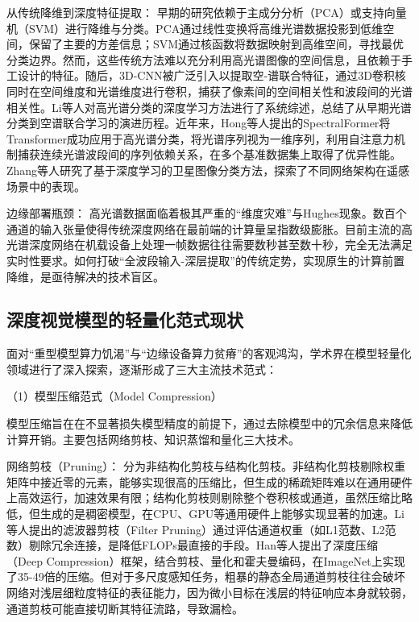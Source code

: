 从传统降维到深度特征提取： 早期的研究依赖于主成分分析（PCA）或支持向量机（SVM）进行降维与分类。PCA通过线性变换将高维光谱数据投影到低维空间，保留了主要的方差信息；SVM通过核函数将数据映射到高维空间，寻找最优分类边界。然而，这些传统方法难以充分利用高光谱图像的空间信息，且依赖于手工设计的特征。随后，3D-CNN被广泛引入以提取空-谱联合特征，通过3D卷积核同时在空间维度和光谱维度进行卷积，捕获了像素间的空间相关性和波段间的光谱相关性。Li等人对高光谱分类的深度学习方法进行了系统综述\cite{li2019hyperspectral}，总结了从早期光谱分类到空谱联合学习的演进历程。近年来，Hong等人提出的SpectralFormer\cite{hong2021spectral}将Transformer成功应用于高光谱分类，将光谱序列视为一维序列，利用自注意力机制捕获连续光谱波段间的序列依赖关系，在多个基准数据集上取得了优异性能。Zhang等人研究了基于深度学习的卫星图像分类方法\cite{zhang2020satellite}，探索了不同网络架构在遥感场景中的表现。

边缘部署瓶颈： 高光谱数据面临着极其严重的“维度灾难”与Hughes现象。数百个通道的输入张量使得传统深度网络在最前端的计算量呈指数级膨胀。目前主流的高光谱深度网络在机载设备上处理一帧数据往往需要数秒甚至数十秒，完全无法满足实时性要求。如何打破“全波段输入-深层提取”的传统定势，实现原生的计算前置降维，是亟待解决的技术盲区。


\subsection{深度视觉模型的轻量化范式现状}
面对“重型模型算力饥渴”与“边缘设备算力贫瘠”的客观鸿沟，学术界在模型轻量化领域进行了深入探索，逐渐形成了三大主流技术范式：

（1）模型压缩范式（Model Compression）

模型压缩旨在在不显著损失模型精度的前提下，通过去除模型中的冗余信息来降低计算开销。主要包括网络剪枝、知识蒸馏和量化三大技术。

网络剪枝（Pruning）： 分为非结构化剪枝与结构化剪枝。非结构化剪枝剔除权重矩阵中接近零的元素，能够实现很高的压缩比，但生成的稀疏矩阵难以在通用硬件上高效运行，加速效果有限；结构化剪枝则剔除整个卷积核或通道，虽然压缩比略低，但生成的是稠密模型，在CPU、GPU等通用硬件上能够实现显著的加速。Li等人\cite{li2017pruning}提出的滤波器剪枝（Filter Pruning）通过评估通道权重（如L1范数、L2范数）剔除冗余连接，是降低FLOPs最直接的手段。Han等人\cite{han2015deep}提出了深度压缩（Deep Compression）框架，结合剪枝、量化和霍夫曼编码，在ImageNet上实现了35-49倍的压缩。但对于多尺度感知任务，粗暴的静态全局通道剪枝往往会破坏网络对浅层细粒度特征的表征能力，因为微小目标在浅层的特征响应本身就较弱，通道剪枝可能直接切断其特征流路，导致漏检。

